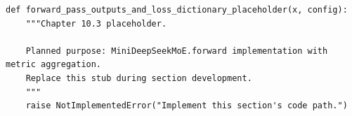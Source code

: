 \begin{lstlisting}[style=bookpython,caption={Planned code placeholder for forward pass outputs and loss dictionary.},label={lst:ch10-forward-pass-outputs-and-loss-dictionary}]
def forward_pass_outputs_and_loss_dictionary_placeholder(x, config):
    """Chapter 10.3 placeholder.

    Planned purpose: MiniDeepSeekMoE.forward implementation with metric aggregation.
    Replace this stub during section development.
    """
    raise NotImplementedError("Implement this section's code path.")
\end{lstlisting}
